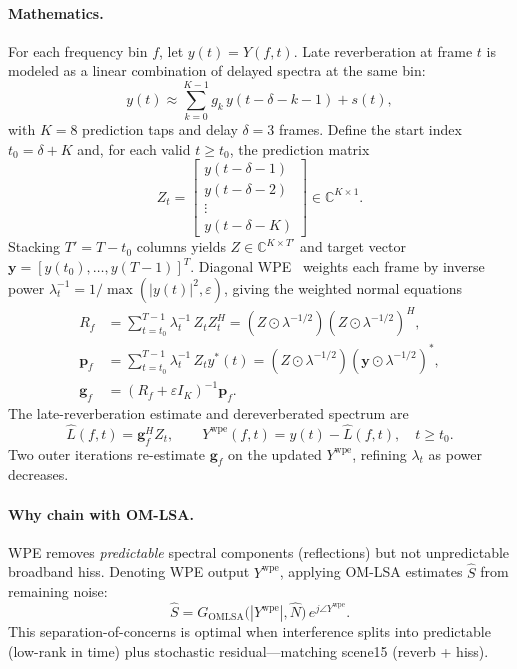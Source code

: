 \paragraph{Mathematics.}
For each frequency bin $f$, let $y(t)=Y(f,t)$. Late reverberation at frame $t$ is modeled as a linear combination of delayed spectra at the same bin:
\begin{equation}
  y(t) \approx \sum_{k=0}^{K-1} g_k\, y(t-\delta-k-1) + s(t),
  \label{eq:wpe_model}
\end{equation}
with $K=8$ prediction taps and delay $\delta=3$ frames. Define the start index $t_0=\delta+K$ and, for each valid $t\ge t_0$, the prediction matrix
\begin{equation}
  Z_t = \begin{bmatrix}
    y(t-\delta-1) \\ y(t-\delta-2) \\ \vdots \\ y(t-\delta-K)
  \end{bmatrix} \in \mathbb{C}^{K\times 1}.
  \label{eq:wpe_Z}
\end{equation}
Stacking $T'=T-t_0$ columns yields $Z\in\mathbb{C}^{K\times T'}$ and target vector $\mathbf{y}=[y(t_0),\ldots,y(T-1)]^T$. Diagonal WPE~\cite{loizou2013} weights each frame by inverse power $\lambda_t^{-1}=1/\max(|y(t)|^2,\varepsilon)$, giving the weighted normal equations
\begin{align}
  R_f &= \sum_{t=t_0}^{T-1} \lambda_t^{-1}\, Z_t Z_t^H
       = (Z \odot \lambda^{-1/2}) (Z \odot \lambda^{-1/2})^H, \\
  \mathbf{p}_f &= \sum_{t=t_0}^{T-1} \lambda_t^{-1}\, Z_t y^*(t)
              = (Z \odot \lambda^{-1/2}) (\mathbf{y} \odot \lambda^{-1/2})^*, \\
  \mathbf{g}_f &= (R_f + \varepsilon I_K)^{-1} \mathbf{p}_f.
  \label{eq:wpe_normal}
\end{align}
The late-reverberation estimate and dereverberated spectrum are
\begin{equation}
  \hat{L}(f,t) = \mathbf{g}_f^H Z_t, \qquad
  Y^{\mathrm{wpe}}(f,t) = y(t) - \hat{L}(f,t), \quad t\ge t_0.
  \label{eq:wpe_subtract}
\end{equation}
Two outer iterations re-estimate $\mathbf{g}_f$ on the updated $Y^{\mathrm{wpe}}$, refining $\lambda_t$ as power decreases.

\paragraph{Why chain with OM-LSA.}
WPE removes \emph{predictable} spectral components (reflections) but not unpredictable broadband hiss. Denoting WPE output $Y^{\mathrm{wpe}}$, applying OM-LSA estimates $\hat{S}$ from remaining noise:
\begin{equation}
  \hat{S} = G_{\mathrm{OMLSA}}\bigl(|Y^{\mathrm{wpe}}|, \hat{N}\bigr)\, e^{j\angle Y^{\mathrm{wpe}}}.
\end{equation}
This separation-of-concerns is optimal when interference splits into predictable (low-rank in time) plus stochastic residual---matching scene15 (reverb + hiss).

